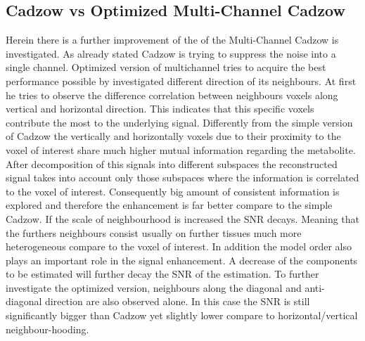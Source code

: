 \subsection{Cadzow vs Optimized Multi-Channel Cadzow }


Herein there is a further improvement of the of the Multi-Channel Cadzow is investigated. As already stated Cadzow is trying to suppress the noise into a single channel. Optimized version of multichannel tries to acquire the best performance possible by investigated different direction of its neighbours. At first he tries to observe the difference correlation between neighbours voxels along vertical and horizontal direction. This indicates that this specific voxels contribute the most to the underlying signal. Differently from the simple version of Cadzow the vertically and horizontally voxels due to their proximity to the voxel of interest share much higher mutual information regarding the metabolite. After decomposition of this signals into different subspaces the reconstructed signal takes into account only those subspaces where the information is correlated to the voxel of interest. Consequently big amount of consistent information is explored and therefore the enhancement is far better compare to the simple Cadzow. If the scale of neighbourhood is increased the SNR decays. Meaning that the furthers neighbours consist usually on further tissues much more heterogeneous compare to the voxel of interest. In addition the model order also plays an important role in the signal enhancement. A decrease of the components to be estimated will further decay the SNR of the estimation. To further investigate the optimized version, neighbours along the diagonal and anti-diagonal direction are also observed alone. In this case the SNR is still significantly bigger than Cadzow yet slightly lower compare to horizontal/vertical neighbour-hooding\cite{12}. 




